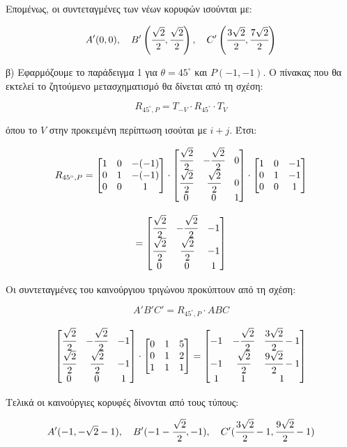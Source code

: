 \begin{solution}
Επομένως, οι συντεταγμένες των νέων κορυφών ισούνται με:

\[
A'(0, 0), \quad B'\left(\cfrac{\sqrt{2}}{2}, \cfrac{\sqrt{2}}{2}\right), \quad C'\left(\cfrac{3\sqrt{2}}{2}, \cfrac{7\sqrt{2}}{2}\right)
\]

β) Εφαρμόζουμε το παράδειγμα 1 για $\theta = 45^\circ$ και $P(-1, -1)$. Ο πίνακας που θα εκτελεί το ζητούμενο μετασχηματισμό θα δίνεται από τη σχέση:

\[
R_{45^\circ, P} = T_{-V} \cdot R_{45^\circ} \cdot T_V
\]

όπου το $V$ στην προκειμένη περίπτωση ισούται με $i + j$. Έτσι:

\[
R_{45^\circ, P} =
\begin{bmatrix}
1 & 0 & -(-1) \\
0 & 1 & -(-1) \\
0 & 0 & 1
\end{bmatrix}
\cdot
\begin{bmatrix}
\cfrac{\sqrt{2}}{2} & -\cfrac{\sqrt{2}}{2} & 0 \\
\cfrac{\sqrt{2}}{2} & \cfrac{\sqrt{2}}{2} & 0 \\
0 & 0 & 1
\end{bmatrix}
\cdot
\begin{bmatrix}
1 & 0 & -1 \\
0 & 1 & -1 \\
0 & 0 & 1
\end{bmatrix}
\]

\[
=
\begin{bmatrix}
\cfrac{\sqrt{2}}{2} & -\cfrac{\sqrt{2}}{2} & -1 \\
\cfrac{\sqrt{2}}{2} & \cfrac{\sqrt{2}}{2} & -1 \\
0 & 0 & 1
\end{bmatrix}
\]

Οι συντεταγμένες του καινούργιου τριγώνου προκύπτουν από τη σχέση:

\[
A'B'C' = R_{45^\circ, P} \cdot ABC
\]

\[
\begin{bmatrix}
\cfrac{\sqrt{2}}{2} & -\cfrac{\sqrt{2}}{2} & -1 \\
\cfrac{\sqrt{2}}{2} & \cfrac{\sqrt{2}}{2} & -1 \\
0 & 0 & 1
\end{bmatrix}
\cdot
\begin{bmatrix}
0 & 1 & 5 \\
0 & 1 & 2 \\
1 & 1 & 1
\end{bmatrix}
=
\begin{bmatrix}
-1 & -\cfrac{\sqrt{2}}{2} & \cfrac{3\sqrt{2}}{2} - 1 \\
-1 & \cfrac{\sqrt{2}}{2} & \cfrac{9\sqrt{2}}{2} - 1 \\
1 & 1 & 1
\end{bmatrix}
\]

Τελικά οι καινούργιες κορυφές δίνονται από τους τύπους:

\[
A'(-1, -\sqrt{2}-1), \quad B'(-1-\cfrac{\sqrt{2}}{2}, -1), \quad C'(\cfrac{3\sqrt{2}}{2}-1, \cfrac{9\sqrt{2}}{2}-1)
\]

\end{solution}
